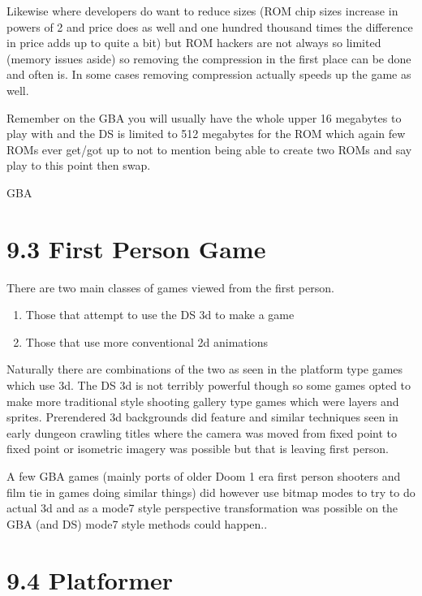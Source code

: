 \documentclass[
]{book}
\providecommand{\tightlist}{%
  \setlength{\itemsep}{0pt}\setlength{\parskip}{0pt}}
\begin{document}
Likewise where developers do want to reduce sizes (ROM chip sizes increase in powers of 2 and price does as well and one hundred thousand times the difference in price adds up to quite a bit) but ROM hackers are not always so limited (memory issues aside) so removing the compression in the first place can be done and often is. In some cases removing compression actually speeds up the game as well.

Remember on the GBA you will usually have the whole upper 16 megabytes to play with and the DS is limited to 512 megabytes for the ROM which again few ROMs ever get/got up to not to mention being able to create two ROMs and say play to this point then swap.

GBA

\hypertarget{first-person-game}{%
\section{9.3 First Person Game}\label{first-person-game}}

There are two main classes of games viewed from the first person.

\begin{enumerate}
\def\labelenumi{\arabic{enumi}.}
\tightlist
\item
  Those that attempt to use the DS 3d to make a game
\item
  Those that use more conventional 2d animations
\end{enumerate}

Naturally there are combinations of the two as seen in the platform type games which use 3d. The DS 3d is not terribly powerful though so some games opted to make more traditional style shooting gallery type games which were layers and sprites. Prerendered 3d backgrounds did feature and similar techniques seen in early dungeon crawling titles where the camera was moved from fixed point to fixed point or isometric imagery was possible but that is leaving first person.

A few GBA games (mainly ports of older Doom 1 era first person shooters and film tie in games doing similar things) did however use bitmap modes to try to do actual 3d and as a mode7 style perspective transformation was possible on the GBA (and DS) mode7 style methods could happen..

\hypertarget{platformer}{%
\section{9.4 Platformer}\label{platformer}}
\end{document}
